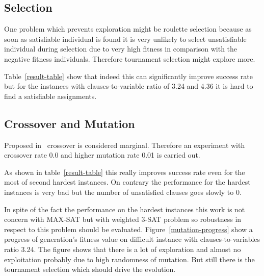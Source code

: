 \documentclass{article}
\begin{document}
\subsection{Selection}

One problem which prevents exploration might be roulette selection
because as soon as satisfiable individual is found
it is very unlikely to select unsatisfiable individual during selection
due to very high fitness in comparison with the negative fitness individuals.
Therefore tournament selection might explore more.

Table~\ref{result-table} show that indeed this can significantly improve
success rate but for the instances with clauses-to-variable ratio of 3.24
and 4.36 it is hard to find a satisfiable assignments.

\subsection{Crossover and Mutation}

Proposed in~\cite{park1995} crossover is considered marginal.
Therefore an experiment with crossover rate 0.0 and higher mutation rate 0.01
is carried out.

As shown in table~\ref{result-table} this really improves success rate even
for the most of second hardest instances.
On contrary the performance for the hardest instances is very bad but the
number of unsatisfied clauses goes slowly to 0.

In spite of the fact the performance on the hardest instances
this work is not concern with MAX-SAT but with weighted 3-SAT problem
so robustness in respect to this problem should be evaluated.
Figure~\ref{mutation-progress} show a progress of generation's fitness value
on difficult instance with clauses-to-variables ratio 3.24.
The figure shows that there is a lot of exploration
and almost no exploitation probably due to high randomness of mutation.
But still there is the tournament selection which should drive the evolution.
\end{document}
